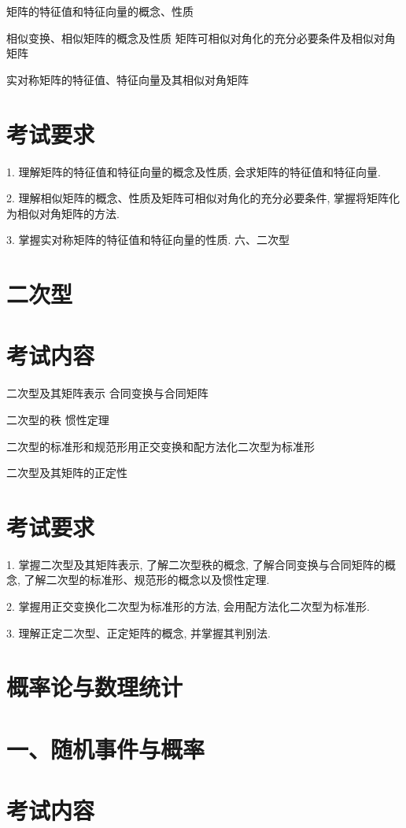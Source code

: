 \documentclass[10pt]{article}
\begin{document}
矩阵的特征值和特征向量的概念、性质 

相似变换、相似矩阵的概念及性质 矩阵可相似对角化的充分必要条件及相似对角矩阵 

实对称矩阵的特征值、特征向量及其相似对角矩阵

\section*{考试要求}

1. 理解矩阵的特征值和特征向量的概念及性质, 会求矩阵的特征值和特征向量.

2. 理解相似矩阵的概念、性质及矩阵可相似对角化的充分必要条件, 掌握将矩阵化为相似对角矩阵的方法.

3. 掌握实对称矩阵的特征值和特征向量的性质. 六、二次型

\section*{二次型}
\section*{考试内容}

二次型及其矩阵表示 合同变换与合同矩阵 

二次型的秩 惯性定理 

二次型的标准形和规范形用正交变换和配方法化二次型为标准形 

二次型及其矩阵的正定性

\section*{考试要求}

1. 掌握二次型及其矩阵表示, 了解二次型秩的概念, 了解合同变换与合同矩阵的概念, 了解二次型的标准形、规范形的概念以及惯性定理.

2. 掌握用正交变换化二次型为标准形的方法, 会用配方法化二次型为标准形.

3. 理解正定二次型、正定矩阵的概念, 并掌握其判别法.

\section*{概率论与数理统计}

\section*{一、随机事件与概率}

\section*{考试内容}
\end{document}
